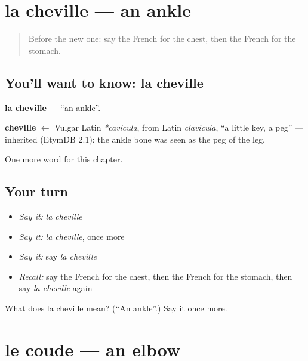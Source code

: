 \section[la cheville]{la cheville — an ankle}

\label{lesson:FR-C52-cheville}



\begin{quote}
Before the new one: say the French for the chest, then the French for the stomach.
\end{quote}

\subsection*{You'll want to know: la cheville}
\textbf{la cheville} — \textquotedblleft{}an ankle\textquotedblright{}.

\begin{cousinweb}
\textbf{cheville} $\leftarrow$ Vulgar Latin \emph{*cavicula}, from Latin \emph{clavicula}, \textquotedblleft{}a little key, a peg\textquotedblright{} — inherited (EtymDB 2.1): the ankle bone was seen as the peg of the leg.
\end{cousinweb}

\begin{grammarlens}[title={What you've built}]
One more word for this chapter.
\end{grammarlens}

\subsection*{Your turn}
\begin{itemize}
\raggedright
  \item \emph{Say it:} \emph{la cheville}
  \item \emph{Say it:} \emph{la cheville}, once more
  \item \emph{Say it:} say \emph{la cheville}
  \item \emph{Recall:} say the French for the chest, then the French for the stomach, then say \emph{la cheville} again
\end{itemize}

\begin{tcolorbox}[breakable,colback=teal!4,colframe=teal!35!black,title={Before you move on}]
What does la cheville mean? (\textquotedblleft{}An ankle\textquotedblright{}.) Say it once more.
\end{tcolorbox}
\section[le coude]{le coude — an elbow}

